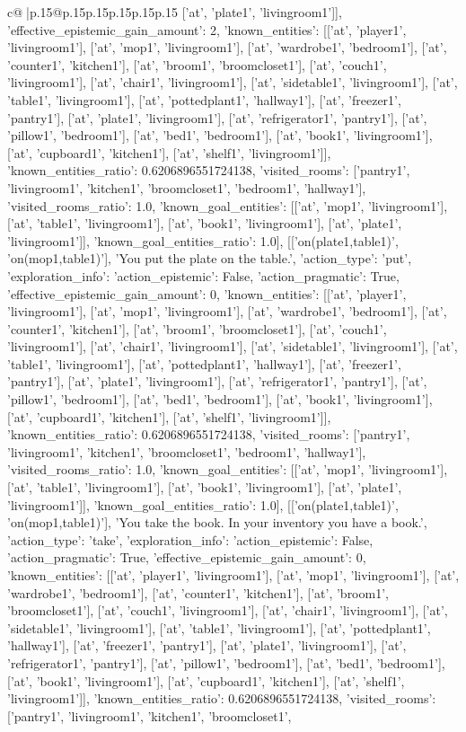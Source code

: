 \documentclass{article}
\begin{document}
{\begin{supertabular}{c@{$\;$}|p{.15\linewidth}@{}p{.15\linewidth}p{.15\linewidth}p{.15\linewidth}p{.15\linewidth}p{.15\linewidth}}
{{{['at', 'plate1', 'livingroom1']], 'effective_epistemic_gain_amount': 2, 'known_entities': [['at', 'player1', 'livingroom1'], ['at', 'mop1', 'livingroom1'], ['at', 'wardrobe1', 'bedroom1'], ['at', 'counter1', 'kitchen1'], ['at', 'broom1', 'broomcloset1'], ['at', 'couch1', 'livingroom1'], ['at', 'chair1', 'livingroom1'], ['at', 'sidetable1', 'livingroom1'], ['at', 'table1', 'livingroom1'], ['at', 'pottedplant1', 'hallway1'], ['at', 'freezer1', 'pantry1'], ['at', 'plate1', 'livingroom1'], ['at', 'refrigerator1', 'pantry1'], ['at', 'pillow1', 'bedroom1'], ['at', 'bed1', 'bedroom1'], ['at', 'book1', 'livingroom1'], ['at', 'cupboard1', 'kitchen1'], ['at', 'shelf1', 'livingroom1']], 'known_entities_ratio': 0.6206896551724138, 'visited_rooms': ['pantry1', 'livingroom1', 'kitchen1', 'broomcloset1', 'bedroom1', 'hallway1'], 'visited_rooms_ratio': 1.0, 'known_goal_entities': [['at', 'mop1', 'livingroom1'], ['at', 'table1', 'livingroom1'], ['at', 'book1', 'livingroom1'], ['at', 'plate1', 'livingroom1']], 'known_goal_entities_ratio': 1.0}}], [['on(plate1,table1)', 'on(mop1,table1)'], 'You put the plate on the table.', {'action_type': 'put', 'exploration_info': {'action_epistemic': False, 'action_pragmatic': True, 'effective_epistemic_gain_amount': 0, 'known_entities': [['at', 'player1', 'livingroom1'], ['at', 'mop1', 'livingroom1'], ['at', 'wardrobe1', 'bedroom1'], ['at', 'counter1', 'kitchen1'], ['at', 'broom1', 'broomcloset1'], ['at', 'couch1', 'livingroom1'], ['at', 'chair1', 'livingroom1'], ['at', 'sidetable1', 'livingroom1'], ['at', 'table1', 'livingroom1'], ['at', 'pottedplant1', 'hallway1'], ['at', 'freezer1', 'pantry1'], ['at', 'plate1', 'livingroom1'], ['at', 'refrigerator1', 'pantry1'], ['at', 'pillow1', 'bedroom1'], ['at', 'bed1', 'bedroom1'], ['at', 'book1', 'livingroom1'], ['at', 'cupboard1', 'kitchen1'], ['at', 'shelf1', 'livingroom1']], 'known_entities_ratio': 0.6206896551724138, 'visited_rooms': ['pantry1', 'livingroom1', 'kitchen1', 'broomcloset1', 'bedroom1', 'hallway1'], 'visited_rooms_ratio': 1.0, 'known_goal_entities': [['at', 'mop1', 'livingroom1'], ['at', 'table1', 'livingroom1'], ['at', 'book1', 'livingroom1'], ['at', 'plate1', 'livingroom1']], 'known_goal_entities_ratio': 1.0}}], [['on(plate1,table1)', 'on(mop1,table1)'], 'You take the book. In your inventory you have a book.', {'action_type': 'take', 'exploration_info': {'action_epistemic': False, 'action_pragmatic': True, 'effective_epistemic_gain_amount': 0, 'known_entities': [['at', 'player1', 'livingroom1'], ['at', 'mop1', 'livingroom1'], ['at', 'wardrobe1', 'bedroom1'], ['at', 'counter1', 'kitchen1'], ['at', 'broom1', 'broomcloset1'], ['at', 'couch1', 'livingroom1'], ['at', 'chair1', 'livingroom1'], ['at', 'sidetable1', 'livingroom1'], ['at', 'table1', 'livingroom1'], ['at', 'pottedplant1', 'hallway1'], ['at', 'freezer1', 'pantry1'], ['at', 'plate1', 'livingroom1'], ['at', 'refrigerator1', 'pantry1'], ['at', 'pillow1', 'bedroom1'], ['at', 'bed1', 'bedroom1'], ['at', 'book1', 'livingroom1'], ['at', 'cupboard1', 'kitchen1'], ['at', 'shelf1', 'livingroom1']], 'known_entities_ratio': 0.6206896551724138, 'visited_rooms': ['pantry1', 'livingroom1', 'kitchen1', 'broomcloset1', }}}
\end{supertabular}}
\end{document}
